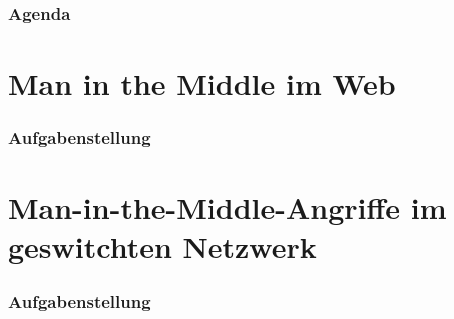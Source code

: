\documentclass{beamer}
\begin{document}
	\begin{frame} %
		\frametitle{Agenda}
		\tableofcontents
	\end{frame}
	
	\section{Man in the Middle im Web}
	
	\begin{frame} %
		\frametitle{Aufgabenstellung}
	
    \end{frame}
    
    \section{Man-in-the-Middle-Angriffe im geswitchten Netzwerk}
    	
    	\begin{frame} %
    		\frametitle{Aufgabenstellung}
    	
        \end{frame}
    
    
    
\end{document}
